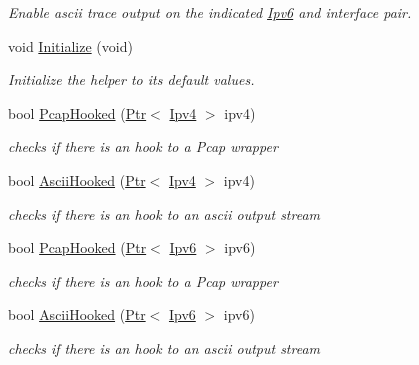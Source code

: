 \begin{DoxyCompactItemize}
\begin{DoxyCompactList}\small\item\em Enable ascii trace output on the indicated \hyperlink{classns3_1_1Ipv6}{Ipv6} and interface pair. \end{DoxyCompactList}\item 
void \hyperlink{classns3_1_1InternetStackHelper_a51479cdc84af52b048ce586785643856}{Initialize} (void)
\begin{DoxyCompactList}\small\item\em Initialize the helper to its default values. \end{DoxyCompactList}\item 
bool \hyperlink{classns3_1_1InternetStackHelper_a884260b23b3df90bf09eeb403df4d988}{Pcap\+Hooked} (\hyperlink{classns3_1_1Ptr}{Ptr}$<$ \hyperlink{classns3_1_1Ipv4}{Ipv4} $>$ ipv4)
\begin{DoxyCompactList}\small\item\em checks if there is an hook to a Pcap wrapper \end{DoxyCompactList}\item 
bool \hyperlink{classns3_1_1InternetStackHelper_a4b26d61d78933a884a03fbda4ec6eddc}{Ascii\+Hooked} (\hyperlink{classns3_1_1Ptr}{Ptr}$<$ \hyperlink{classns3_1_1Ipv4}{Ipv4} $>$ ipv4)
\begin{DoxyCompactList}\small\item\em checks if there is an hook to an ascii output stream \end{DoxyCompactList}\item 
bool \hyperlink{classns3_1_1InternetStackHelper_a02016af4653dffbda1aa746d4a55b3b5}{Pcap\+Hooked} (\hyperlink{classns3_1_1Ptr}{Ptr}$<$ \hyperlink{classns3_1_1Ipv6}{Ipv6} $>$ ipv6)
\begin{DoxyCompactList}\small\item\em checks if there is an hook to a Pcap wrapper \end{DoxyCompactList}\item 
bool \hyperlink{classns3_1_1InternetStackHelper_ad5d996df2601304a011990ffd9c3c2e1}{Ascii\+Hooked} (\hyperlink{classns3_1_1Ptr}{Ptr}$<$ \hyperlink{classns3_1_1Ipv6}{Ipv6} $>$ ipv6)
\begin{DoxyCompactList}\small\item\em checks if there is an hook to an ascii output stream \end{DoxyCompactList}\end{DoxyCompactItemize}
